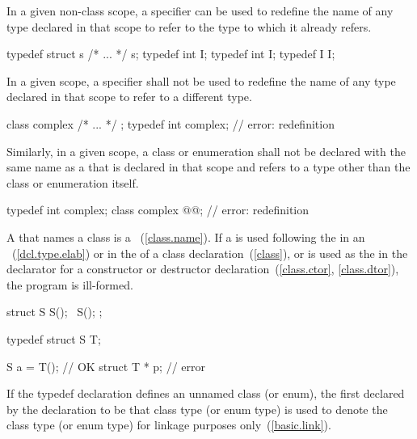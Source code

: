 \pnum
{}%
In a given non-class scope, a  specifier can be used to
redefine the name of any type declared in that scope to refer to the
type to which it already refers.
\enterexample

\begin{codeblock}
typedef struct s { /* ... */ } s;
typedef int I;
typedef int I;
typedef I I;
\end{codeblock}
\exitexampleb

\pnum
In a given scope, a  specifier shall not be used to
redefine the name of any type declared in that scope to refer to a
different type.
\enterexample

\begin{codeblock}
class complex { /* ... */ };
typedef int complex;            // error: redefinition
\end{codeblock}

\exitexampleb
Similarly, in a given scope, a class or enumeration shall not be
declared with the same name as a  that is
declared in that scope and refers to a type other than the class or
enumeration itself.
\enterexample

\begin{codeblock}
typedef int complex;
class complex @@;   // error: redefinition
\end{codeblock}
\exitexampleb

\pnum
{}%
A  that names a class is a
~(\ref{class.name}). If
a  is used following the 
in an ~(\ref{dcl.type.elab})
or in the  of a class declaration~(\ref{class}),
or is used as the  in the declarator for a
constructor or destructor declaration~(\ref{class.ctor}, \ref{class.dtor}),
the program is ill-formed.
\enterexample

\begin{codeblock}
struct S {
    S();
    ~S();
};

typedef struct S T;

S a = T();                      // OK
struct T * p;                   // error
\end{codeblock}
\exitexampleb

\pnum
{}%
%
%
If the typedef declaration defines an unnamed class (or enum), the first
 declared by the declaration to be that class
type (or enum type) is used to denote the class type (or enum type) for
linkage purposes only~(\ref{basic.link}).
\enterexample

